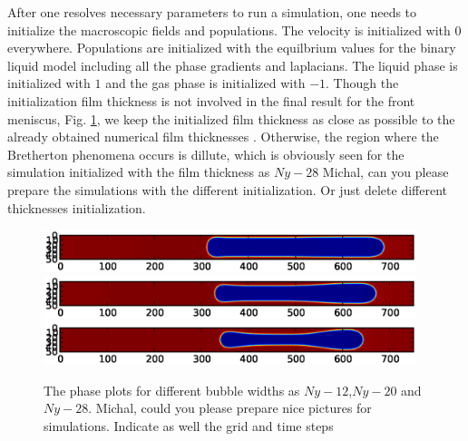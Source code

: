 \documentclass{article}
\begin{document}
After one resolves necessary parameters to run a simulation, one needs to
initialize the macroscopic fields and populations.
The velocity is initialized with $0$ everywhere. Populations are initialized
with the equilbrium values for the binary liquid model including all the phase
gradients and laplacians. The liquid phase is initialized with $1$ and the
gas phase is initialized with $-1$. Though the initialization film thickness
is not involved in the final result for the front meniscus, Fig.
\ref{fig:different:initialization:widths}, we keep the initialized film
thickness as close as possible to the already obtained numerical film
thicknesses \cite{giavedoni-numerical}. Otherwise, the region where the
Bretherton phenomena occurs is dillute, which is obviously seen for the
simulation initialized with the film thickness as $Ny-28$ {\color{red} Michal,
can you please prepare the simulations with the different initialization. Or
just delete different thicknesses initialization}.
\begin{figure}
\includegraphics*[bb=18 350 594 450,width=0.97\textwidth]
{Figures/force_width_6.eps}
\includegraphics*[bb=18 350 594 450,
width=0.97\textwidth]{Figures/force_width_10.eps}
\includegraphics*[bb=18 350 594 450,
width=0.97\textwidth]{Figures/force_width_14.eps}
\caption{\color{red} The phase plots for different bubble widths as
$Ny-12$,$Ny-20$ and
$Ny-28$. Michal, could you please prepare nice pictures for
simulations. Indicate as well the
grid and time steps\label{fig:different:initialization:widths}}
\end{figure}
\end{document}
